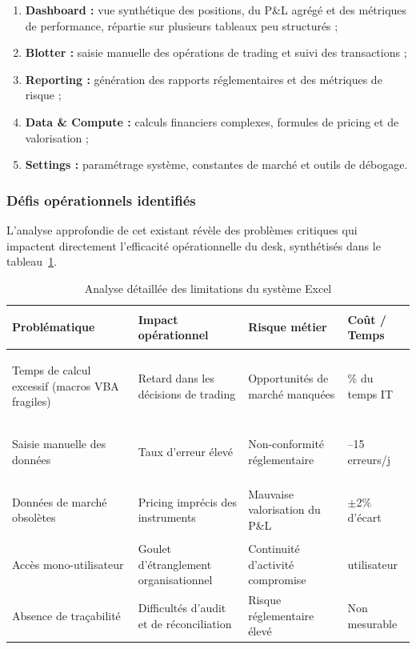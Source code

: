 \begin{enumerate}
    \item \textbf{Dashboard :} vue synthétique des positions, du P\&L agrégé et des métriques de performance, répartie sur plusieurs tableaux peu structurés ;
    \item \textbf{Blotter :} saisie manuelle des opérations de trading et suivi des transactions ;
    \item \textbf{Reporting :} génération des rapports réglementaires et des métriques de risque ;
    \item \textbf{Data \& Compute :} calculs financiers complexes, formules de pricing et de valorisation ;
    \item \textbf{Settings :} paramétrage système, constantes de marché et outils de débogage.
\end{enumerate}

\subsubsection{Défis opérationnels identifiés}

\hspace{1cm} L'analyse approfondie de cet existant révèle des problèmes critiques qui impactent directement l'efficacité opérationnelle du desk, synthétisés dans le tableau~\ref{tab:limitations_excel}.

\begin{table}[H]
\centering
\renewcommand{\arraystretch}{1.4}
\begin{tabularx}{\textwidth}{>{\bfseries\raggedright\arraybackslash}p{3cm} X X >{\raggedright\arraybackslash}p{2.2cm}}
\toprule
Problématique & \textbf{Impact opérationnel} & \textbf{Risque métier} & \textbf{Coût / Temps} \\
\midrule
Temps de calcul excessif (macros VBA fragiles) & Retard dans les décisions de trading & Opportunités de marché manquées & 10\% du temps IT \\
Saisie manuelle des données   & Taux d'erreur élevé                      & Non-conformité réglementaire     & 0--15 erreurs/j \\
Données de marché obsolètes   & Pricing imprécis des instruments         & Mauvaise valorisation du P\&L    & $\pm$2\% d'écart \\
Accès mono-utilisateur        & Goulet d'étranglement organisationnel    & Continuité d'activité compromise & 1 utilisateur \\
Absence de traçabilité        & Difficultés d'audit et de réconciliation & Risque réglementaire élevé       & Non mesurable \\
\bottomrule
\end{tabularx}
\caption{Analyse détaillée des limitations du système Excel}
\label{tab:limitations_excel}
\end{table}

